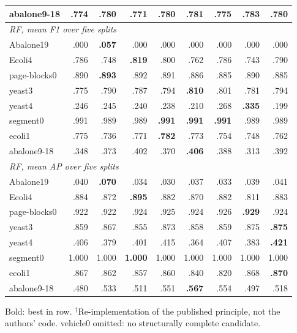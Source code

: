 \begin{table}[!t]
{\begin{tabular}{lrrrrrrrr}
abalone9-18 & .774 & .780 & .771 & .780 & .781 & .775 & \textbf{.783} & .780 \\
\midrule
\multicolumn{9}{l}{\textit{RF, mean F1 over five splits}} \\
Abalone19 & .000 & \textbf{.057} & .000 & .000 & .000 & .000 & .000 & .000 \\
Ecoli4 & .786 & .748 & \textbf{.819} & .800 & .762 & .786 & .743 & .790 \\
page-blocks0 & .890 & \textbf{.893} & .892 & .891 & .886 & .885 & .890 & .885 \\
yeast3 & .775 & .790 & .787 & .794 & \textbf{.810} & .801 & .781 & .794 \\
yeast4 & .246 & .245 & .240 & .238 & .210 & .268 & \textbf{.335} & .199 \\
segment0 & .991 & .989 & .989 & \textbf{.991} & \textbf{.991} & \textbf{.991} & .989 & .989 \\
ecoli1 & .775 & .736 & .771 & \textbf{.782} & .773 & .754 & .748 & .762 \\
abalone9-18 & .348 & .373 & .402 & .370 & \textbf{.406} & .388 & .313 & .392 \\
\midrule
\multicolumn{9}{l}{\textit{RF, mean AP over five splits}} \\
Abalone19 & .040 & \textbf{.070} & .034 & .030 & .037 & .033 & .039 & .041 \\
Ecoli4 & .884 & .872 & \textbf{.895} & .882 & .870 & .882 & .811 & .883 \\
page-blocks0 & .922 & .922 & .924 & .925 & .924 & .926 & \textbf{.929} & .924 \\
yeast3 & .859 & .867 & .855 & .873 & .858 & .859 & .875 & \textbf{.875} \\
yeast4 & .406 & .379 & .401 & .415 & .364 & .407 & .383 & \textbf{.421} \\
segment0 & 1.000 & 1.000 & \textbf{1.000} & 1.000 & 1.000 & 1.000 & 1.000 & 1.000 \\
ecoli1 & .867 & .862 & .857 & .860 & .840 & .820 & .868 & \textbf{.870} \\
abalone9-18 & .480 & .533 & .511 & .551 & \textbf{.567} & .554 & .497 & .518 \\
\bottomrule
\end{tabular}}

\vspace{2pt}\parbox{\textwidth}{\scriptsize Bold: best in row. $^\dagger$Re-implementation of the published principle, not the authors' code. vehicle0 omitted: no structurally complete candidate.}
\end{table}
